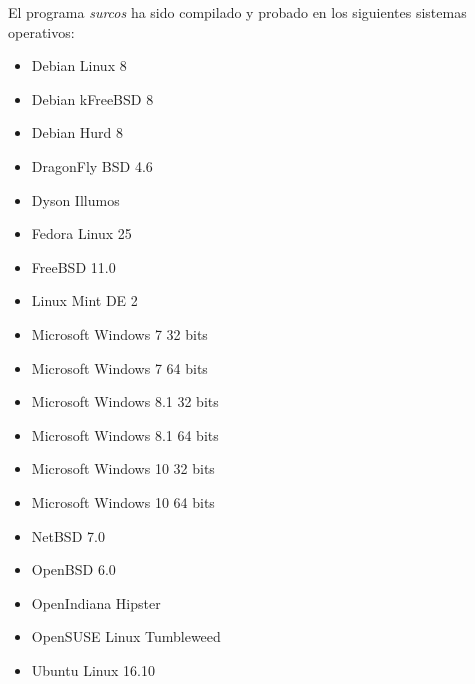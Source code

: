 El programa \emph{surcos} ha sido compilado y probado en los siguientes sistemas
operativos:
\begin{itemize}
\item Debian Linux 8
\item Debian kFreeBSD 8
\item Debian Hurd 8
\item DragonFly BSD 4.6
\item Dyson Illumos
\item Fedora Linux 25
\item FreeBSD 11.0
\item Linux Mint DE 2
\item Microsoft Windows 7 32 bits
\item Microsoft Windows 7 64 bits
\item Microsoft Windows 8.1 32 bits
\item Microsoft Windows 8.1 64 bits
\item Microsoft Windows 10 32 bits
\item Microsoft Windows 10 64 bits
\item NetBSD 7.0
\item OpenBSD 6.0
\item OpenIndiana Hipster
\item OpenSUSE Linux Tumbleweed
\item Ubuntu Linux 16.10
\end{itemize}
